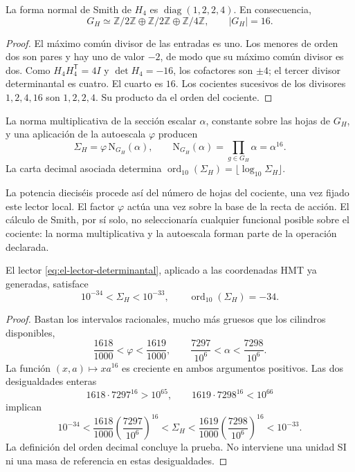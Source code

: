\begin{lemma}
La forma normal de Smith de \(H_4\) es
\(\operatorname{diag}(1,2,2,4)\). En consecuencia,
\[
 G_H\simeq\mathbb Z/2\mathbb Z\oplus\mathbb Z/2\mathbb Z
 \oplus\mathbb Z/4\mathbb Z,\qquad |G_H|=16.
\]
\end{lemma}
\begin{proof}
El máximo común divisor de las entradas es uno. Los menores de orden dos
son pares y hay uno de valor \(-2\), de modo que su máximo común divisor
es dos. Como \(H_4H_4^{\mathsf T}=4I\) y \(\det H_4=-16\), los
cofactores son \(\pm4\); el tercer divisor determinantal es cuatro.
El cuarto es \(16\). Los cocientes sucesivos de los divisores
\(1,2,4,16\) son \(1,2,2,4\). Su producto da el orden del cociente.
\end{proof}

\begin{definition}
La norma multiplicativa de la sección escalar \(\alpha\), constante
sobre las hojas de \(G_H\), y una aplicación de la autoescala
\(\varphi\) producen
\begin{equation}
 \Sigma_H=\varphi\,\mathrm N_{G_H}(\alpha),\qquad
 \mathrm N_{G_H}(\alpha)=\prod_{g\in G_H}\alpha=\alpha^{16}.
 \label{eq:el-lector-determinantal}
\end{equation}
La carta decimal asociada determina
\(\operatorname{ord}_{10}(\Sigma_H)=\lfloor\log_{10}\Sigma_H\rfloor\).
\end{definition}

La potencia dieciséis procede así del número de hojas del cociente, una
vez fijado este lector local. El factor \(\varphi\) actúa una vez sobre
la base de la recta de acción. El cálculo de Smith, por sí solo, no
seleccionaría cualquier funcional posible sobre el cociente: la norma
multiplicativa y la autoescala forman parte de la operación declarada.

\begin{theorem}
El lector \eqref{eq:el-lector-determinantal}, aplicado a las coordenadas
HMT ya generadas, satisface
\begin{equation}
 10^{-34}<\Sigma_H<10^{-33},\qquad
 \operatorname{ord}_{10}(\Sigma_H)=-34.
 \label{eq:el-decada}
\end{equation}
\end{theorem}
\begin{proof}
Bastan los intervalos racionales, mucho más gruesos que los cilindros
disponibles,
\[
 \frac{1618}{1000}<\varphi<\frac{1619}{1000},\qquad
 \frac{7297}{10^6}<\alpha<\frac{7298}{10^6}.
\]
La función \((x,a)\mapsto xa^{16}\) es creciente en ambos argumentos
positivos. Las dos desigualdades enteras
\[
 1618\cdot7297^{16}>10^{65},\qquad
 1619\cdot7298^{16}<10^{66}
\]
implican
\[
 10^{-34}
 <\frac{1618}{1000}\left(\frac{7297}{10^6}\right)^{16}
 <\Sigma_H
 <\frac{1619}{1000}\left(\frac{7298}{10^6}\right)^{16}
 <10^{-33}.
\]
La definición del orden decimal concluye la prueba. No interviene una
unidad SI ni una masa de referencia en estas desigualdades.
\end{proof}

